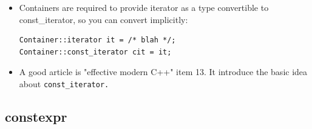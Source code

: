 \documentclass[a4paper,11pt,twoside]{book}
\begin{document}
\begin{itemize}
	\item Containers are required to provide iterator as a type convertible to const\_iterator, so you can convert implicitly:
\begin{lstlisting}	
Container::iterator it = /* blah */;
Container::const_iterator cit = it;	
\end{lstlisting}

	\item A good article is "effective modern C++" item 13. It introduce the basic idea about \texttt{const\_iterator.}
\end{itemize}

\subsection{constexpr}
\end{document}

